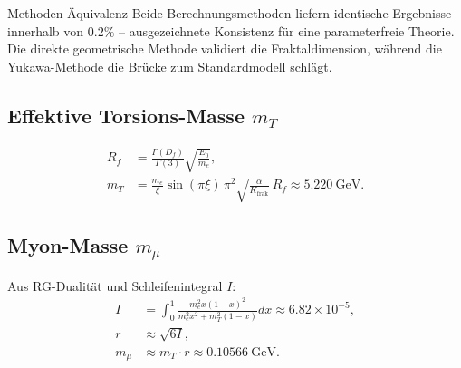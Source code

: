 	\begin{table}[H]
		\centering
		\caption{Konsistenz der Massenberechnungsmethoden in der T0-Theorie}
		\label{tab:methoden_konsistenz}
	\end{table}
	
	\begin{result}{Methoden-Äquivalenz}{}
		Beide Berechnungsmethoden liefern identische Ergebnisse innerhalb von $0.2\%$ -- ausgezeichnete Konsistenz für eine parameterfreie Theorie. Die direkte geometrische Methode validiert die Fraktaldimension, während die Yukawa-Methode die Brücke zum Standardmodell schlägt.
	\end{result}
	
	\subsection{Effektive Torsions-Masse $m_T$}
	\label{subsec:torsions_masse}
	
	\begin{align}
		R_f &= \frac{\Gamma(D_f)}{\Gamma(3)} \sqrt{\frac{E_0}{m_e}}, \label{eq:Rf} \\
		m_T &= \frac{m_e}{\xi} \sin(\pi \xi) \, \pi^2 \sqrt{\frac{\alpha}{K_{\text{frak}}}} \, R_f \approx \SI{5.220}{\giga\electronvolt}. \label{eq:mT}
	\end{align}
	
	\subsection{Myon-Masse $m_{\mu}$}
	\label{subsec:myon_masse}
	
	Aus RG-Dualität und Schleifenintegral $I$:
	\begin{align}
		I &= \int_0^1 \frac{m_e^2 x (1-x)^2}{m_e^2 x^2 + m_T^2 (1-x)}  dx \approx 6.82 \times 10^{-5}, \label{eq:I} \\
		r &\approx \sqrt{6 I}, \label{eq:r} \\
		m_{\mu} &\approx m_T \cdot r \approx \SI{0.10566}{\giga\electronvolt}. \label{eq:mmu}
	\end{align}
	
